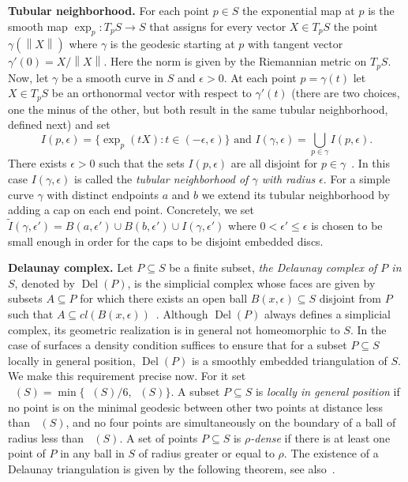 \documentclass[reqno,english]{amsart}
\numberwithin{claimcounter}{theorem}
\theoremstyle{remark}
\theoremstyle{definition}
\numberwithin{theorem}{section}
\newcommand{\norm}[1]{\left\|#1\right\|} %
\DeclareMathOperator{\rinj}{r_{inj}}
\DeclareMathOperator{\rscv}{r_{scv}}
\DeclareMathOperator{\rdel}{r_{Del}}
\DeclareMathOperator{\Del}{Del}
\begin{document}
\vspace{3mm}
\noindent
{\bf Tubular neighborhood.} For each point $p\in S$ the exponential map at $p$ is the smooth map $\exp_p\colon T_pS \rightarrow S$
that assigns for every vector $X\in T_pS$ the point $\gamma(\norm{X})$ where $\gamma$ is the geodesic starting
at $p$ with tangent vector $\gamma'(0)=X/\norm{X}$. Here the norm is given by the Riemannian metric on $T_pS$.
Now, let $\gamma$ be a smooth curve in $S$ and $\epsilon>0$.
At each point $p=\gamma(t)$ let $X\in T_pS$ be an orthonormal vector with respect to $\gamma'(t)$ (there are two choices, one the minus of the other, but both result in the same tubular  neighborhood, defined next) and set
$$I(p,\epsilon) = \{ \exp_p(tX) \colon t\in (-\epsilon,\epsilon)\} \text{ and } I(\gamma,\epsilon) = \bigcup_{p\in \gamma} I(p,\epsilon).$$
There exists $\epsilon>0$ such that the sets $I(p,\epsilon)$ are all disjoint for $p\in \gamma$~\cite[Proposition 7.26]{oneill83-tubular}.
In this case $I(\gamma,\epsilon)$ is called the \emph{tubular neighborhood of $\gamma$ with radius $\epsilon$}.
For a simple curve $\gamma$ with distinct endpoints $a$ and $b$ we extend its tubular neighborhood by adding a cap on
each end point. Concretely, we set $\tilde{I}(\gamma,\epsilon') = B(a,\epsilon')\cup B(b,\epsilon')\cup I(\gamma, \epsilon')$
where $0<\epsilon'\leq \epsilon$ is chosen to be small enough in order for the caps to be disjoint embedded discs.

\vspace{3mm}
\noindent
{\bf Delaunay complex.} Let $P\subseteq S$ be a finite subset,
\emph{the Delaunay complex of $P$ in $S$}, denoted by $\Del(P)$,
is the simplicial complex whose faces are given by subsets $A \subseteq P$
for which there exists an open ball $B(x,\epsilon)\subseteq S$ disjoint from $P$
such that $A \subseteq cl (B(x,\epsilon))$~\cite{delaunay34-sphere}.
Although $\Del(P)$ always defines a simplicial complex, its geometric realization is in general not homeomorphic to $S$.
In the case of surfaces a density condition suffices to ensure that for a subset $P\subseteq S$ locally in general position, $\Del(P)$ is a smoothly embedded triangulation of $S$. 
We make this requirement precise now. For it set $\rdel(S) = \min\{\rinj(S)/6, \rscv(S)\}$.
A subset $P\subseteq S$ is \emph{locally in general position} if no point is on the minimal geodesic between other two points at distance less than $\rdel(S)$, and no four points are simultaneously on the boundary of a ball of radius less than $\rdel(S)$.
A set of points $P\subseteq S$ is \emph{$\rho$-dense} if there is at least one point of $P$
in any ball in $S$ of radius greater or equal to $\rho$.
The existence of a Delaunay triangulation is given by the following theorem,
see also~\cite[Theorem 2]{dyer08-surface}.
\end{document}
